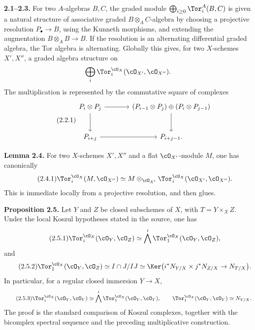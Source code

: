\textbf{2.1--2.3.} For two \(A\)-algebras \(B,C\), the graded module \(\bigoplus_{i\ge0}\Tor_i^A(B,C)\) is given a natural structure of associative graded \(B\otimes_A C\)-algebra by choosing a projective resolution \(P_\bullet\to B\), using the Kunneth morphisms, and extending the augmentation \(B\otimes_A B\to B\). If the resolution is an alternating differential graded algebra, the Tor algebra is alternating. Globally this gives, for two \(X\)-schemes \(X',X''\), a graded algebra structure on
\[
\bigoplus_i\Tor_i^{\cO_X}(\cO_{X'},\cO_{X''}).
\]
The multiplication is represented by the commutative square of complexes
\begin{equation}\tag{2.2.1}
\begin{tikzcd}[column sep=large,row sep=large]
P_i\otimes P_j \arrow[r] \arrow[d] & (P_{i-1}\otimes P_j)\oplus(P_i\otimes P_{j-1}) \arrow[d]\\
P_{i+j} \arrow[r] & P_{i+j-1}.
\end{tikzcd}
\end{equation}

\textbf{Lemma 2.4.} For two \(X\)-schemes \(X',X''\) and a flat \(\cO_{X'}\)-module \(M\), one has canonically
\begin{equation}\tag{2.4.1}
\Tor_i^{\cO_X}(M,\cO_{X''})\simeq
M\otimes_{\cO_{X'}}\Tor_i^{\cO_X}(\cO_{X'},\cO_{X''}).
\end{equation}
This is immediate locally from a projective resolution, and then glues.

\textbf{Proposition 2.5.} Let \(Y\) and \(Z\) be closed subschemes of \(X\), with \(T=Y\times_XZ\). Under the local Koszul hypotheses stated in the source, one has
\begin{equation}\tag{2.5.1}
\Tor_i^{\cO_X}(\cO_Y,\cO_Z)\simeq \bigwedge^i\Tor_1^{\cO_X}(\cO_Y,\cO_Z),
\end{equation}
and
\begin{equation}\tag{2.5.2}
\Tor_1^{\cO_X}(\cO_Y,\cO_Z)
\simeq I\cap J/IJ
\simeq \Ker\bigl(i^*N_{Y/X}\times j^*N_{Z/X}\to N_{T/X}\bigr).
\end{equation}
In particular, for a regular closed immersion \(Y\to X\),
\begin{equation}\tag{2.5.3}
\Tor_i^{\cO_X}(\cO_Y,\cO_Y)\simeq
\bigwedge^i\Tor_1^{\cO_X}(\cO_Y,\cO_Y),
\qquad
\Tor_1^{\cO_X}(\cO_Y,\cO_Y)\simeq N_{Y/X}.
\end{equation}
The proof is the standard comparison of Koszul complexes, together with the bicomplex spectral sequence and the preceding multiplicative construction.


